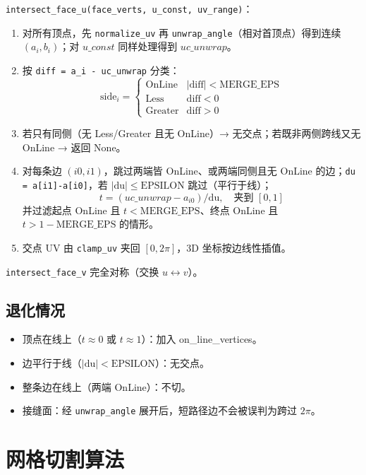 \documentclass[12pt,a4paper]{article}
\begin{document}
\texttt{intersect\_face\_u(face\_verts, u\_const, uv\_range)}：
\begin{enumerate}
\item 对所有顶点，先 \texttt{normalize\_uv} 再 \texttt{unwrap\_angle}（相对首顶点）得到连续 $(a_i, b_i)$；对 $u\_const$ 同样处理得到 $uc\_unwrap$。
\item 按 \texttt{diff = a\_i - uc\_unwrap} 分类：
  \[
  \mathrm{side}_i = \begin{cases}
  \mathrm{OnLine} & |\mathrm{diff}| < \mathrm{MERGE\_EPS} \\
  \mathrm{Less}   & \mathrm{diff} < 0 \\
  \mathrm{Greater} & \mathrm{diff} > 0
  \end{cases}
  \]
\item 若只有同侧（无 Less/Greater 且无 OnLine）→ 无交点；若既非两侧跨线又无 OnLine → 返回 None。
\item 对每条边 $(i0,i1)$，跳过两端皆 OnLine、或两端同侧且无 OnLine 的边；\texttt{du = a[i1]-a[i0]}，若 $|\mathrm{du}|\le \mathrm{EPSILON}$ 跳过（平行于线）；
  \[
  t = (uc\_unwrap - a_{i0}) / \mathrm{du},\quad \text{夹到 }[0,1]
  \]
  并过滤起点 OnLine 且 $t<\mathrm{MERGE\_EPS}$、终点 OnLine 且 $t>1-\mathrm{MERGE\_EPS}$ 的情形。
\item 交点 UV 由 \texttt{clamp\_uv} 夹回 $[0,2\pi]$，3D 坐标按边线性插值。
\end{enumerate}
\texttt{intersect\_face\_v} 完全对称（交换 $u\leftrightarrow v$）。

\subsection{退化情况}

\begin{itemize}
\item 顶点在线上（$t\approx 0$ 或 $t\approx 1$）：加入 on\_line\_vertices。
\item 边平行于线（$|\mathrm{du}|<\mathrm{EPSILON}$）：无交点。
\item 整条边在线上（两端 OnLine）：不切。
\item 接缝面：经 \texttt{unwrap\_angle} 展开后，短路径边不会被误判为跨过 $2\pi$。
\end{itemize}

\section{网格切割算法}
\end{document}

